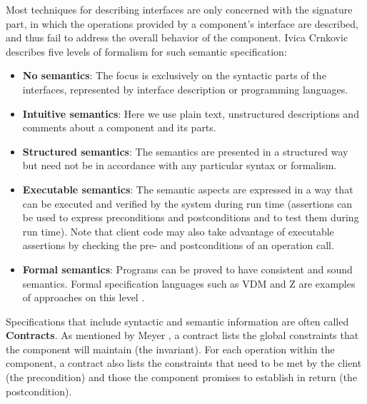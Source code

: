 Most techniques for describing interfaces are only concerned with the
signature part, in which the operations provided by a component's interface
are described, and thus fail to address the overall behavior of the component.
Ivica Crnkovic describes five levels of formalism for such 
semantic specification:
\begin{itemize}
\item {\bf No semantics}: The focus is exclusively on the syntactic parts of the
interfaces, represented by interface description or programming languages.
\item {\bf Intuitive semantics}: Here we use plain text, unstructured 
descriptions and comments about a component and its parts.
\item {\bf Structured semantics}: The semantics are presented in a structured 
way but need not be in accordance with any particular syntax or formalism.
\item {\bf Executable semantics}: The semantic aspects are expressed in a way 
that can be executed and verified by the system during run time (assertions 
can be used to express preconditions and postconditions and to test them during 
run time). Note that client code may also take advantage of executable 
assertions by checking the pre- and postconditions of an operation call.
\item {\bf Formal semantics}: Programs can be proved to have consistent and 
sound semantics. Formal specification languages such as VDM and Z are examples 
of approaches on this level \cite{ZNotation}.
\end{itemize}

\noindent
Specifications that include syntactic and semantic information are often called 
{\bf Contracts}.
As mentioned by Meyer \cite{OOSC97}, a contract lists the global constraints
that the component will maintain (the invariant).
For each operation within the component, a contract also lists the constraints
that need to be met by the client (the precondition) and those the component
promises to establish in return (the postcondition).



